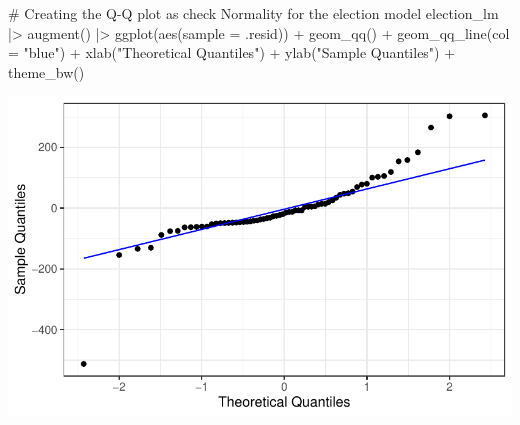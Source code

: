 \documentclass[
  letterpaper,
  DIV=11,
  numbers=noendperiod]{scrartcl}
\newenvironment{Shaded}{\begin{snugshade}}{\end{snugshade}}
\newcommand{\AttributeTok}[1]{\textcolor[rgb]{0.40,0.45,0.13}{#1}}
\newcommand{\CommentTok}[1]{\textcolor[rgb]{0.37,0.37,0.37}{#1}}
\newcommand{\FunctionTok}[1]{\textcolor[rgb]{0.28,0.35,0.67}{#1}}
\newcommand{\NormalTok}[1]{\textcolor[rgb]{0.00,0.23,0.31}{#1}}
\newcommand{\SpecialCharTok}[1]{\textcolor[rgb]{0.37,0.37,0.37}{#1}}
\newcommand{\StringTok}[1]{\textcolor[rgb]{0.13,0.47,0.30}{#1}}
\begin{document}
\begin{Shaded}
\begin{Highlighting}[]
\CommentTok{\# Creating the Q{-}Q plot as check Normality for the election model}
\NormalTok{election\_lm }\SpecialCharTok{|\textgreater{}}
  \FunctionTok{augment}\NormalTok{() }\SpecialCharTok{|\textgreater{}}
  \FunctionTok{ggplot}\NormalTok{(}\FunctionTok{aes}\NormalTok{(}\AttributeTok{sample =}\NormalTok{ .resid)) }\SpecialCharTok{+}
  \FunctionTok{geom\_qq}\NormalTok{() }\SpecialCharTok{+}
  \FunctionTok{geom\_qq\_line}\NormalTok{(}\AttributeTok{col =} \StringTok{"blue"}\NormalTok{) }\SpecialCharTok{+}
  \FunctionTok{xlab}\NormalTok{(}\StringTok{"Theoretical Quantiles"}\NormalTok{) }\SpecialCharTok{+}
  \FunctionTok{ylab}\NormalTok{(}\StringTok{"Sample Quantiles"}\NormalTok{) }\SpecialCharTok{+}
  \FunctionTok{theme\_bw}\NormalTok{()}
\end{Highlighting}
\end{Shaded}

\includegraphics{SDS-291-case-study-1_files/figure-pdf/unnamed-chunk-4-3.pdf}
\end{document}

